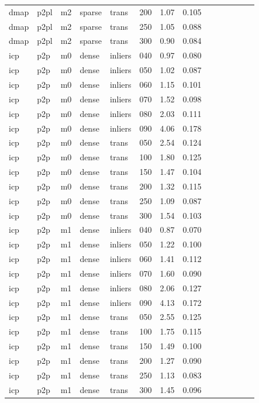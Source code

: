 \begin{table}[htbp]
\begin{tabular}{llllllrrrrrrrr}
  dmap & p2pl & m2 & sparse & trans & 200 & 1.07 & 0.105 \\
  dmap & p2pl & m2 & sparse & trans & 250 & 1.05 & 0.088 \\
  dmap & p2pl & m2 & sparse & trans & 300 & 0.90 & 0.084 \\
  icp & p2p & m0 & dense & inliers & 040 & 0.97 & 0.080 \\
  icp & p2p & m0 & dense & inliers & 050 & 1.02 & 0.087 \\
  icp & p2p & m0 & dense & inliers & 060 & 1.15 & 0.101 \\
  icp & p2p & m0 & dense & inliers & 070 & 1.52 & 0.098 \\
  icp & p2p & m0 & dense & inliers & 080 & 2.03 & 0.111 \\
  icp & p2p & m0 & dense & inliers & 090 & 4.06 & 0.178 \\
  icp & p2p & m0 & dense & trans & 050 & 2.54 & 0.124 \\
  icp & p2p & m0 & dense & trans & 100 & 1.80 & 0.125 \\
  icp & p2p & m0 & dense & trans & 150 & 1.47 & 0.104 \\
  icp & p2p & m0 & dense & trans & 200 & 1.32 & 0.115 \\
  icp & p2p & m0 & dense & trans & 250 & 1.09 & 0.087 \\
  icp & p2p & m0 & dense & trans & 300 & 1.54 & 0.103 \\
  icp & p2p & m1 & dense & inliers & 040 & 0.87 & 0.070 \\
  icp & p2p & m1 & dense & inliers & 050 & 1.22 & 0.100 \\
  icp & p2p & m1 & dense & inliers & 060 & 1.41 & 0.112 \\
  icp & p2p & m1 & dense & inliers & 070 & 1.60 & 0.090 \\
  icp & p2p & m1 & dense & inliers & 080 & 2.06 & 0.127 \\
  icp & p2p & m1 & dense & inliers & 090 & 4.13 & 0.172 \\
  icp & p2p & m1 & dense & trans & 050 & 2.55 & 0.125 \\
  icp & p2p & m1 & dense & trans & 100 & 1.75 & 0.115 \\
  icp & p2p & m1 & dense & trans & 150 & 1.49 & 0.100 \\
  icp & p2p & m1 & dense & trans & 200 & 1.27 & 0.090 \\
  icp & p2p & m1 & dense & trans & 250 & 1.13 & 0.083 \\
  icp & p2p & m1 & dense & trans & 300 & 1.45 & 0.096 \\

\end{tabular}
\end{table}
